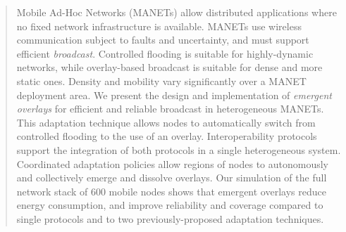 
\begin{abstract}
Mobile Ad-Hoc Networks (MANETs) allow distributed applications where no fixed network infrastructure is available.
MANETs use wireless communication subject to faults and uncertainty, and must support efficient \emph{broadcast}.
Controlled flooding is suitable for highly-dynamic networks, while overlay-based broadcast is suitable for dense and more static ones.
Density and mobility vary significantly over a MANET deployment area.
We present the design and implementation of \emph{emergent overlays} for efficient and reliable broadcast in heterogeneous MANETs.
This adaptation technique allows nodes to automatically switch from controlled flooding to the use of an overlay.
Interoperability protocols support the integration of both protocols in a single heterogeneous system.
Coordinated adaptation policies allow regions of nodes to autonomously and collectively emerge and dissolve overlays.
Our simulation of the full network stack of 600 mobile nodes shows that emergent overlays reduce energy consumption, and improve reliability and coverage compared to single protocols and to two previously-proposed adaptation techniques.
\end{abstract}
